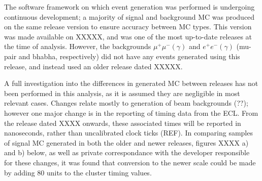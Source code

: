\documentclass[12pt]{thesis}  %
\begin{document}
The software framework on which event generation was performed is undergoing continuous development; a majority of signal and background MC was produced on the same release version to ensure accuracy between MC types. This version was made available on XXXXX, and was one of the most up-to-date releases at the time of analysis. However, the backgrounds $\mu^+\mu^-(\gamma)$ and $e^+ e^-(\gamma)$ (mu-pair and bhabha, respectively) did not have any events generated using this release, and instead used an older release dated XXXXX.

A full investigation into the differences in generated MC between releases has not been performed in this analysis, as it is assumed they are negligible in most relevant cases. Changes relate mostly to generation of beam backgrounds (??); however one major change is in the reporting of timing data from the ECL. From the release dated XXXX onwards, these associated times will be reported in nanoseconds, rather than uncalibrated clock ticks (REF). In comparing samples of signal MC generated in both the older and newer releases, figures XXXX a) and b) below, as well as private correspondance with the developer responsible for these changes, it was found that conversion to the newer scale could be made by adding 80 units to the cluster timing values.
\end{document}
